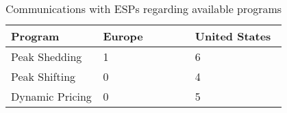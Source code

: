 \begin{table}[h]
\begin{center}
\begin{tabular}{|p{0.265\linewidth}|p{0.265\linewidth}|p{0.265\linewidth}|}
\hline
\textbf{Program} & \textbf{Europe} & \textbf{United States}\\
\hline
Peak Shedding & 1 & 6\\
\hline
Peak Shifting & 0 & 4\\
\hline
Dynamic Pricing & 0 & 5\\
\hline
\end{tabular}
\end{center}
\caption{Communications with ESPs regarding available programs}
\label{fig:table3}
\end{table}